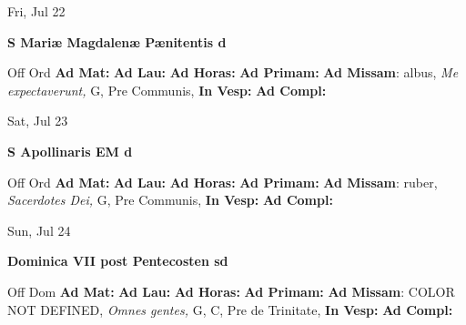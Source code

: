 \documentclass[10pt]{book}
\begin{document}
\begin{center}
\begin{minipage}{3.5in}
\vspace{2em}
\begin{center}Fri, Jul 22
\end{center}
\textbf{ \large S Mariæ Magdalenæ Pænitentis
\textnormal{\normalsize d}}

\begin{justify}Off Ord
\textbf{Ad Mat: }
\textbf{Ad Lau: }
\textbf{Ad Horas: }
\textbf{Ad Primam: }\textbf{Ad Missam}: albus, \textit{Me expectaverunt,} G, Pre Communis, 
\textbf{In Vesp: }
\textbf{Ad Compl: }
\end{justify}
\end{minipage}
\end{center}

\begin{center}
\begin{minipage}{3.5in}
\vspace{2em}
\begin{center}Sat, Jul 23
\end{center}
\textbf{ \large S Apollinaris EM
\textnormal{\normalsize d}}

\begin{justify}Off Ord
\textbf{Ad Mat: }
\textbf{Ad Lau: }
\textbf{Ad Horas: }
\textbf{Ad Primam: }\textbf{Ad Missam}: ruber, \textit{Sacerdotes Dei,} G, Pre Communis, 
\textbf{In Vesp: }
\textbf{Ad Compl: }
\end{justify}
\end{minipage}
\end{center}

\begin{center}
\begin{minipage}{3.5in}
\vspace{2em}
\begin{center}Sun, Jul 24
\end{center}
\textbf{ \large Dominica VII post Pentecosten
\textnormal{\normalsize sd}}

\begin{justify}Off Dom
\textbf{Ad Mat: }
\textbf{Ad Lau: }
\textbf{Ad Horas: }
\textbf{Ad Primam: }\textbf{Ad Missam}: COLOR NOT DEFINED, \textit{Omnes gentes,} G, C, Pre de Trinitate, 
\textbf{In Vesp: }
\textbf{Ad Compl: }
\end{justify}
\end{minipage}
\end{center}
\end{document}

